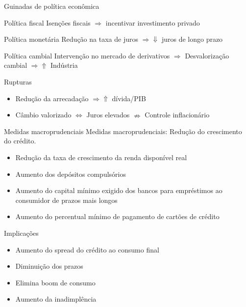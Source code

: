 \documentclass[presentation]{beamer}
\begin{document}
\begin{frame}[label={sec:org689bd99}]{Guinadas de política econômica}
\begin{block}{Política fiscal}
Isenções fiscais \(\Rightarrow\) incentivar investimento privado
\end{block}

\begin{block}{Política monetária}
Redução na taxa de juros \(\Rightarrow \Downarrow\) juros de longo prazo
\end{block}

\begin{block}{Política cambial}
Intervenção no mercado de derivativos \(\Rightarrow\) \alert{Desvalorização} cambial \(\Rightarrow \Uparrow\) Indústria
\end{block}

\begin{block}{Rupturas}
\begin{itemize}
\item Redução da arrecadação \(\Rightarrow \Uparrow\) dívida/PIB
\item Câmbio valorizado \(\Leftrightarrow\) Juros elevados \(\nRightarrow\) Controle inflacionário
\end{itemize}
\end{block}
\end{frame}

\begin{frame}[label={sec:org3912a52}]{Medidas macroprudenciais}
\alert{Medidas macroprudenciais:} Redução do crescimento do crédito.

\begin{itemize}
\item Redução da taxa de crescimento da renda disponível real
\item Aumento dos depósitos compulsórios
\item Aumento do capital mínimo exigido dos bancos para empréstimos ao consumidor de prazos mais longos
\item Aumento do percentual mínimo de pagamento de cartões de crédito
\end{itemize}

\begin{block}{Implicações}
\begin{itemize}
\item Aumento do spread do crédito ao consumo final
\item Diminuição dos prazos
\item Elimina \alert{boom} de consumo
\item Aumento da inadimplência
\end{itemize}
\end{block}
\end{frame}
\end{document}
